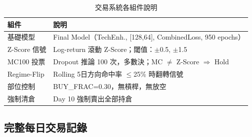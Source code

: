 \documentclass[12pt,a4paper]{article}
\begin{document}
\begin{table}[H]
\centering
\caption{交易系統各組件說明}
\begin{tabular}{ll}
\toprule
\textbf{組件} & \textbf{說明} \\
\midrule
基礎模型      & Final Model（TechEnh., [128,64], CombinedLoss, 950 epochs） \\
Z-Score 信號  & Log-return 滾動 Z-Score；閾值：$\pm$0.5, $\pm$1.5 \\
MC100 投票    & Dropout 推論 100 次，多數決；MC $\neq$ Z-Score $\Rightarrow$ Hold \\
Regime-Flip  & Rolling 5日方向命中率 $\leq$25\% 時翻轉信號 \\
部位控制      & BUY\_FRAC=0.30，無槓桿，無放空 \\
強制清倉      & Day 10 強制賣出全部持倉 \\
\bottomrule
\end{tabular}
\end{table}

\subsection{完整每日交易記錄}
\end{document}
